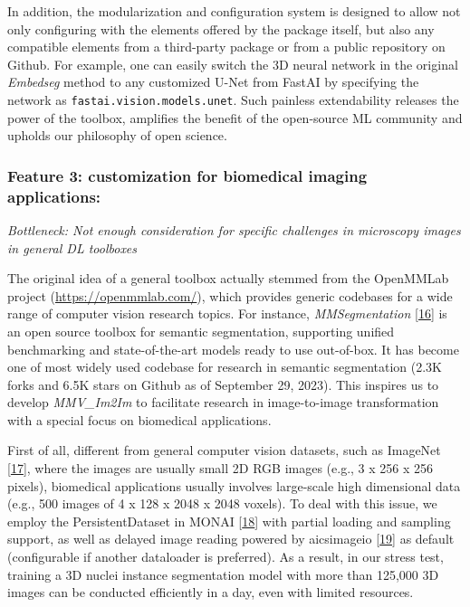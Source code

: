 In addition, the modularization and configuration system is designed to allow not only configuring with the elements offered by the package itself, but also any compatible elements from a third-party package or from a public repository on Github. For example, one can easily switch the 3D neural network in the original \emph{Embedseg} method to any customized U-Net from FastAI by specifying the network as \texttt{fastai.vision.models.unet}. Such painless extendability releases the power of the toolbox, amplifies the benefit of the open-source ML community and upholds our philosophy of open science.

\hypertarget{feature-3-customization-for-biomedical-imaging-applications}{%
\subsubsection{Feature 3: customization for biomedical imaging applications:}\label{feature-3-customization-for-biomedical-imaging-applications}}

\emph{Bottleneck: Not enough consideration for specific challenges in microscopy images in general DL toolboxes}

The original idea of a general toolbox actually stemmed from the OpenMMLab project (\url{https://openmmlab.com/}), which provides generic codebases for a wide range of computer vision research topics. For instance, \emph{MMSegmentation} {[}\protect\hyperlink{ref-EcizztLg}{16}{]} is an open source toolbox for semantic segmentation, supporting unified benchmarking and state-of-the-art models ready to use out-of-box. It has become one of most widely used codebase for research in semantic segmentation (2.3K forks and 6.5K stars on Github as of September 29, 2023). This inspires us to develop \emph{MMV\_Im2Im} to facilitate research in image-to-image transformation with a special focus on biomedical applications.

First of all, different from general computer vision datasets, such as ImageNet {[}\protect\hyperlink{ref-lt4BNUoG}{17}{]}, where the images are usually small 2D RGB images (e.g., 3 x 256 x 256 pixels), biomedical applications usually involves large-scale high dimensional data (e.g., 500 images of 4 x 128 x 2048 x 2048 voxels). To deal with this issue, we employ the PersistentDataset in MONAI {[}\protect\hyperlink{ref-UU62HYC6}{18}{]} with partial loading and sampling support, as well as delayed image reading powered by aicsimageio {[}\protect\hyperlink{ref-gsfWGJKf}{19}{]} as default (configurable if another dataloader is preferred). As a result, in our stress test, training a 3D nuclei instance segmentation model with more than 125,000 3D images can be conducted efficiently in a day, even with limited resources.

